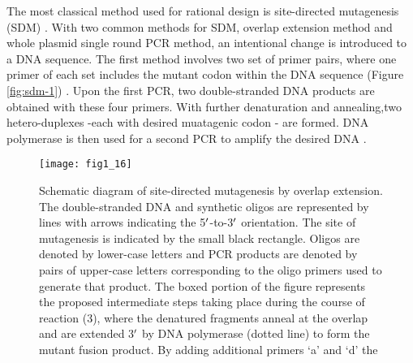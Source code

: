 \begin{refsection}
The most classical method used for rational design
is site-directed mutagenesis (SDM) \cite{Arnold1993}. With two common methods
for SDM, overlap extension method and whole plasmid single round PCR method, an
intentional change is introduced to a DNA sequence. The first method involves
two set of primer pairs, where one primer of each set includes the mutant codon
within the DNA sequence (Figure \ref{fig:sdm-1}) \cite{Ho1989}. Upon the first
PCR, two double-stranded DNA products are obtained with
these four primers. With further denaturation and annealing,two hetero-duplexes
-each with desired muatagenic codon - are formed. DNA polymerase is then used
for a second PCR to amplify the desired DNA \cite{Ho1989}. 
\begin{figure}[h!] \centering \texttt{[image: fig1\_16]}
    \caption[Schematic diagram of site-directed mutagenesis by overlap
        extension. The double-stranded DNA and synthetic oligos are represented
        by lines with arrows indicating the 5$\rq$-to-3$\rq$ orientation. The site of
        mutagenesis is indicated by the small black rectangle. Oligos are
        denoted by lower-case letters and PCR products are denoted by pairs of
        upper-case letters corresponding to the oligo primers used to generate
        that product. The boxed portion of the figure represents the proposed
        intermediate steps taking place during the course of reaction (3),
        where the denatured fragments anneal at the overlap and are extended 3’
        by DNA polymerase (dotted line) to form the mutant fusion product. By
        adding additional primers ‘a’ and ‘d’ the mutant fusion product is
        further amplified by PCR.]
        {Schematic diagram of site-directed mutagenesis by overlap extension.
            The double-stranded DNA and synthetic oligos are represented by lines
            with arrows indicating the 5$\rq$-to-3$\rq$ orientation. The site of
            mutagenesis is indicated by the small black rectangle. Oligos are
            denoted by lower-case letters and PCR products are denoted by pairs
            of upper-case letters corresponding to the oligo primers used to
            generate that product. The boxed portion of the figure represents
            the proposed intermediate steps taking place during the course of
            reaction (3), where the denatured fragments anneal at the overlap
            and are extended 3$\rq$ by DNA polymerase (dotted line) to form the
            mutant fusion product. By adding additional primers ‘a’ and ‘d’ the
}
\end{figure}
\end{refsection}
